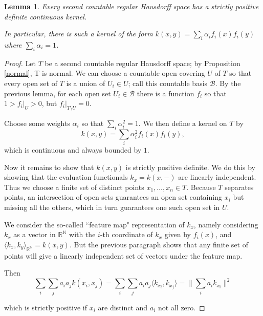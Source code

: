 \documentclass[12pt]{amsart}
\newtheorem{lemma}[theorem]{Lemma}
\theoremstyle{definition}
\numberwithin{equation}{section}
\begin{document}
\begin{lemma}
\label{regular kernel}
    Every second countable regular Hausdorff space has a strictly positive definite continuous kernel.

    In particular, there is such a kernel of the form $k(x,y) = \sum_i\alpha_if_i(x)f_i(y)$ where $\sum_i\alpha_i = 1$. 
\end{lemma}
\begin{proof}
    Let $T$ be a second countable regular Hausdorff space; by Proposition \ref{normal}, T is normal. We can choose a countable open covering $U$ of $T$ so that every open set of $T$ is a union of $U_i \in U$; call this countable basis $\mathcal B$.
    By the previous lemma, for each open set $U_i \in \mathcal B$ there is a function $f_i$ so that $1>f_i|_U > 0$, but $f_i|_{T\setminus U} = 0$. 

    Choose some weights $\alpha_i$ so that $\sum_i\alpha_i^2 = 1$. We then define a kernel on $T$ by \[k(x,y) = \sum_i\alpha_i^2f_i(x)f_i(y),\]
    which is continuous and always bounded by $1$. 

    Now it remains to show that $k(x, y)$ is strictly positive definite. We do this by showing that the evaluation functionals $k_x = k(x, -)$ are linearly independent. Thus we choose a finite set of distinct points $x_1, \dots, x_n \in T$. Because $T$ separates points, an intersection of open sets guarantees an open set containing $x_i$ but missing all the others, which in turn guarantees one such open set in $U$. 
    
    We consider the so-called ``feature map" representation of $k_x$, namely considering $k_x$ as a vector in $\mathbb R^\mathbb N$ with the $i$-th coordinate of $k_x$ given by $f_i(x)$, and $\langle k_x, k_y\rangle_{\mathbb R^\mathbb N} = k(x, y)$. But the previous paragraph shows that any finite set of points will give a linearly independent set of vectors under the feature map.

    Then \[\sum_i\sum_ja_ia_jk(x_i, x_j) = \sum_i\sum_ja_ia_j\langle k_{x_i}, k_{x_j}\rangle = \|\sum_ia_ik_{x_i}\|^2\]

    which is strictly positive if $x_i$ are distinct and $a_i$ not all zero. 
    
\end{proof}
\end{document}
